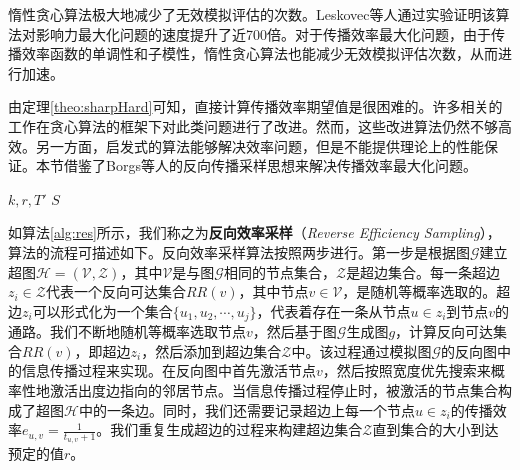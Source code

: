 惰性贪心算法极大地减少了无效模拟评估的次数。Leskovec等人通过实验证明该算法对影响力最大化问题的速度提升了近700倍。对于传播效率最大化问题，由于传播效率函数的单调性和子模性，惰性贪心算法也能减少无效模拟评估次数，从而进行加速。

由定理\ref{theo:sharpHard}可知，直接计算传播效率期望值是很困难的。许多相关的工作在贪心算法的框架下对此类问题进行了改进。然而，这些改进算法仍然不够高效。另一方面，启发式的算法能够解决效率问题，但是不能提供理论上的性能保证。本节借鉴了Borgs等人的反向传播采样思想来解决传播效率最大化问题。

\begin{algorithm}[!ht]
    \caption{$RES$($k$,$r$,$T'\left(\cdot\right)$)}
    \label{alg:res}
    \begin{algorithmic}[1]
	\REQUIRE $k,r,T'$
    \ENSURE $S$
    \ENDFOR
    \ENDFOR
    \end{algorithmic}
\end{algorithm}

如算法\ref{alg:res}所示，我们称之为\textbf{反向效率采样}（\textit{Reverse Efficiency Sampling}），算法的流程可描述如下。反向效率采样算法按照两步进行。第一步是根据图$\mathcal{G}$建立超图$\mathcal{H}=\left(\mathcal{V}, \mathcal{Z} \right)$，其中$\mathcal{V}$是与图$\mathcal{G}$相同的节点集合，$\mathcal{Z}$是超边集合。每一条超边$z_i \in \mathcal{Z}$代表一个反向可达集合$RR\left(v\right)$，其中节点$v \in \mathcal{V}$，是随机等概率选取的。超边$z_i$可以形式化为一个集合$\{u_1, u_2, \cdots, u_j\}$，代表着存在一条从节点$u \in z_i$到节点$v$的通路。我们不断地随机等概率选取节点$v$，然后基于图$\mathcal{G}$生成图$g$，计算反向可达集合$RR\left(v\right)$，即超边$z_i$，然后添加到超边集合$\mathcal{Z}$中。该过程通过模拟图$\mathcal{G}$的反向图中的信息传播过程来实现。在反向图中首先激活节点$v$，然后按照宽度优先搜索来概率性地激活出度边指向的邻居节点。当信息传播过程停止时，被激活的节点集合构成了超图$\mathcal{H}$中的一条边。同时，我们还需要记录超边上每一个节点$u \in z_i$的传播效率$e_{u,v} = \frac{1}{t_{u,v}+1}$。我们重复生成超边的过程来构建超边集合$\mathcal{Z}$直到集合的大小到达预定的值$r$。

